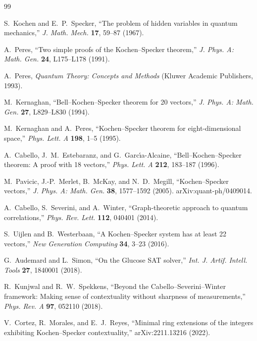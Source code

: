 \documentclass[12pt,a4paper]{article}
\begin{document}
\begin{thebibliography}{99}

S.~Kochen and E.~P.~Specker,
``The problem of hidden variables in quantum mechanics,''
\textit{J. Math. Mech.} \textbf{17}, 59--87 (1967).

A.~Peres,
``Two simple proofs of the Kochen--Specker theorem,''
\textit{J. Phys. A: Math. Gen.} \textbf{24}, L175--L178 (1991).

A.~Peres,
\textit{Quantum Theory: Concepts and Methods}
(Kluwer Academic Publishers, 1993).

M.~Kernaghan,
``Bell--Kochen--Specker theorem for 20 vectors,''
\textit{J. Phys. A: Math. Gen.} \textbf{27}, L829--L830 (1994).

M.~Kernaghan and A.~Peres,
``Kochen--Specker theorem for eight-dimensional space,''
\textit{Phys. Lett. A} \textbf{198}, 1--5 (1995).

A.~Cabello, J.~M.~Estebaranz, and G.~Garc\'{\i}a-Alcaine,
``Bell--Kochen--Specker theorem: A proof with 18 vectors,''
\textit{Phys. Lett. A} \textbf{212}, 183--187 (1996).

M.~Pavicic, J.-P.~Merlet, B.~McKay, and N.~D.~Megill,
``Kochen--Specker vectors,''
\textit{J. Phys. A: Math. Gen.} \textbf{38}, 1577--1592 (2005).
arXiv:quant-ph/0409014.

A.~Cabello, S.~Severini, and A.~Winter,
``Graph-theoretic approach to quantum correlations,''
\textit{Phys. Rev. Lett.} \textbf{112}, 040401 (2014).

S.~Uijlen and B.~Westerbaan,
``A Kochen--Specker system has at least 22 vectors,''
\textit{New Generation Computing} \textbf{34}, 3--23 (2016).

G.~Audemard and L.~Simon,
``On the Glucose SAT solver,''
\textit{Int. J. Artif. Intell. Tools} \textbf{27}, 1840001 (2018).

R.~Kunjwal and R.~W.~Spekkens,
``Beyond the Cabello--Severini--Winter framework: Making sense of contextuality without sharpness of measurements,''
\textit{Phys. Rev. A} \textbf{97}, 052110 (2018).

V.~Cortez, R.~Morales, and E.~J.~Reyes,
``Minimal ring extensions of the integers exhibiting Kochen--Specker contextuality,''
arXiv:2211.13216 (2022).


\end{thebibliography}
\end{document}
